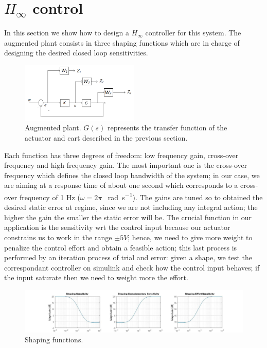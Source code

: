 \section{$H_{\infty}$ control}
In this section we show how to design a $H_{\infty}$ controller for this system. The augmented plant consists in three shaping functions which are in charge of designing the desired closed loop sensitivities.\\

\begin{figure}[h]
\centering
\includegraphics[width=0.5\textwidth]{img/hinf_scheme.png}
\caption{Augmented plant. $G(s)$ represents the transfer function of the actuator and cart described in the previous section.}
\end{figure}
Each function has three degrees of freedom: low frequency gain, cross-over frequency and high frequency gain. The most important one is the cross-over frequency which defines the closed loop bandwidth of the system; in our case, we are aiming at a response time of about one second which corresponds to a cross-over frequency of 1 Hz ($\omega =2\pi $ \SI{}{\radian \per \second}). The gains are tuned so to obtained the desired static error at regime, since we are not including any integral action; the higher the gain the smaller the static error will be. The crucial function in our application is the sensitivity wrt the control input because our actuator constrains us to work in the range $\pm 5V$; hence, we need to give more weight to penalize the control effort and obtain a feasible action; this last process is performed by an iteration process of trial and error: given a shape, we test the correspondant controller on simulink and check how the control input behaves; if the input saturate then we need to weight more the effort.\\

\begin{figure}[h]
\centering
\includegraphics[width=1\textwidth]{img/hinf_shapes.jpg}
\caption{Shaping functions.}
\end{figure}


